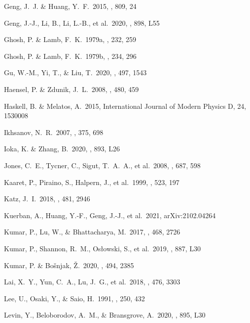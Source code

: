\documentclass[twocolumn]{aastex62}
\begin{document}
\begin{thebibliography}
 Geng, J.~J. \& Huang, Y.~F.\ 2015, \apj, 809, 24

 Geng, J.-J., Li, B., Li, L.-B., et al.\ 2020, \apjl, 898, L55

 Ghosh, P. \& Lamb, F.~K.\ 1979a, \apj, 232, 259

 Ghosh, P. \& Lamb, F.~K.\ 1979b, \apj, 234, 296

 Gu, W.-M., Yi, T., \& Liu, T.\ 2020, \mnras, 497, 1543

 Haensel, P. \& Zdunik, J.~L.\ 2008, \aap, 480, 459

 Haskell, B. \& Melatos, A.\ 2015, International Journal of Modern Physics D, 24, 1530008

 Ikhsanov, N.~R.\ 2007, \mnras, 375, 698

 Ioka, K. \& Zhang, B.\ 2020, \apjl, 893, L26

 Jones, C.~E., Tycner, C., Sigut, T.~A.~A., et al.\ 2008, \apj, 687, 598

 Kaaret, P., Piraino, S., Halpern, J., et al.\ 1999, \apj, 523, 197

 Katz, J.~I.\ 2018, \mnras, 481, 2946

 Kuerban, A., Huang, Y.-F., Geng, J.-J., et al.\ 2021, arXiv:2102.04264

 Kumar, P., Lu, W., \& Bhattacharya, M.\ 2017, \mnras, 468, 2726

 Kumar, P., Shannon, R.~M., Os{\l}owski, S., et al.\ 2019, \apjl, 887, L30

 Kumar, P. \& Bo{\v{s}}njak, {\v{Z}}.\ 2020, \mnras, 494, 2385

 Lai, X.~Y., Yun, C.~A., Lu, J.~G., et al.\ 2018, \mnras, 476, 3303

 Lee, U., Osaki, Y., \& Saio, H.\ 1991, \mnras, 250, 432

 Levin, Y., Beloborodov, A.~M., \& Bransgrove, A.\ 2020, \apjl, 895, L30


\end{thebibliography}
\end{document}
